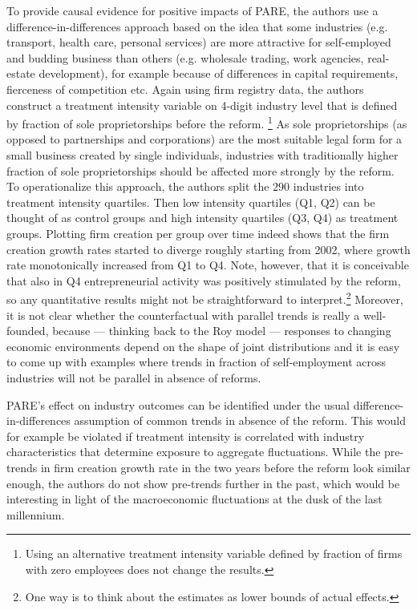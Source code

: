 \noindent To provide causal evidence for positive impacts of PARE, the authors use a difference-in-differences approach based on the idea that some industries (e.g. transport, health care, personal services) are more attractive for self-employed and budding business than others (e.g. wholesale trading, work agencies, real-estate development), for example because of differences in capital requirements, fierceness of competition etc. Again using firm registry data, the authors construct a treatment intensity variable on 4-digit industry level that is defined by fraction of sole proprietorships before the reform. 
\footnote{Using an alternative treatment intensity variable defined by fraction of firms with zero employees does not change the results.}
As sole proprietorships (as opposed to partnerships and corporations) are the most suitable legal form for a small business created by single individuals, industries with traditionally higher fraction of sole proprietorships should be affected more strongly by the reform.
To operationalize this approach, the authors split the $290$ industries into treatment intensity quartiles. Then low intensity quartiles (Q1, Q2) can be thought of as control groups and high intensity quartiles (Q3, Q4) as treatment groups.  Plotting firm creation per group over time indeed shows that the firm creation growth rates started to diverge roughly starting from 2002, where growth rate monotonically increased from Q1 to Q4. Note, however, that it is conceivable that also in Q4 entrepreneurial activity was positively stimulated by the reform, so any quantitative results might not be straightforward to interpret.\footnote{One way is to think about the estimates as lower bounds of actual effects.} Moreover, it is not clear whether the counterfactual with parallel trends is really a well-founded, because --- thinking back to the Roy model --- responses to changing economic environments depend on the shape of joint distributions and it is easy to come up with examples where trends in fraction of self-employment across industries will not be parallel in absence of reforms. \newline

\noindent PARE's effect on industry outcomes can be identified under the usual difference-in-differences assumption of common trends in absence of the reform. This would for example be violated if treatment intensity is correlated with industry characteristics that determine exposure to aggregate fluctuations. While the pre-trends in firm creation growth rate in the two years before the reform look similar enough, the authors do not show pre-trends further in the past, which would be interesting in light of the macroeconomic fluctuations at the dusk of the last millennium. 

